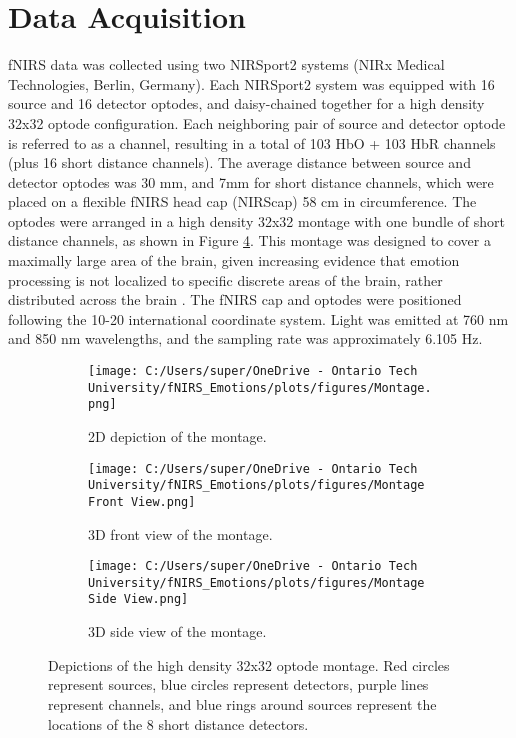 \section{Data Acquisition}
fNIRS data was collected using two NIRSport2 systems (NIRx Medical Technologies, Berlin, Germany). 
Each NIRSport2 system was equipped with 16 source and 16 detector optodes, and daisy-chained together for a high density 32x32 optode configuration. 
Each neighboring pair of source and detector optode is referred to as a channel, resulting in a total of 103 HbO + 103 HbR channels (plus 16 short distance channels).
The average distance between source and detector optodes was 30 mm, and 7mm for short distance channels, which were placed on a flexible fNIRS head cap (NIRScap) 58 cm in circumference. 
The optodes were arranged in a high density 32x32 montage with one bundle of short distance channels, as shown in Figure \ref{fig:montage_combined}.
This montage was designed to cover a maximally large area of the brain, given increasing evidence that emotion processing is not localized to specific discrete areas of the brain, rather distributed across the brain \citep{lindquist_brain_2012}. 
The fNIRS cap and optodes were positioned following the 10-20 international coordinate system.
Light was emitted at 760 nm and 850 nm wavelengths, and the sampling rate was approximately 6.105 Hz.

\begin{figure}[H]
    \centering
    \begin{subfigure}[b]{0.9\textwidth}
        \centering
        \texttt{[image: C:/Users/super/OneDrive - Ontario Tech University/fNIRS\_Emotions/plots/figures/Montage.png]}
        \caption{2D depiction of the montage. }
        \label{fig:montage_2d}
    \end{subfigure}
    \hfill
    \begin{subfigure}[b]{0.45\textwidth}
        \centering
        \texttt{[image: C:/Users/super/OneDrive - Ontario Tech University/fNIRS\_Emotions/plots/figures/Montage Front View.png]}
        \caption{3D front view of the montage.}
        \label{fig:montage_front}
    \end{subfigure}
    \hfill
    \begin{subfigure}[b]{0.45\textwidth}
        \centering
        \texttt{[image: C:/Users/super/OneDrive - Ontario Tech University/fNIRS\_Emotions/plots/figures/Montage Side View.png]}
        \caption{3D side view of the montage.}
        \label{fig:montage_side}
    \end{subfigure}
    \caption{Depictions of the high density 32x32 optode montage. Red circles represent sources, blue circles represent detectors, purple lines represent channels, and blue rings around sources represent the locations of the 8 short distance detectors.}
    \label{fig:montage_combined}
\end{figure}

